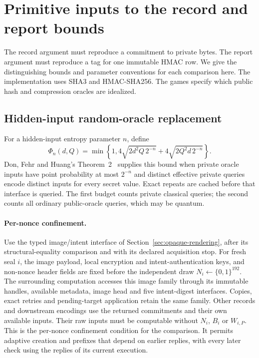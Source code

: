 \section{Primitive inputs to the record and report bounds}
\label{app:primitive-inputs}

The record argument must reproduce a commitment to private bytes.
The report argument must reproduce a tag for one immutable HMAC row.
We give the distinguishing bounds and parameter conventions for each
comparison here. The implementation uses SHA3 and HMAC-SHA256. The
games specify which public hash and compression oracles are idealized.

\subsection{Hidden-input random-oracle replacement}

For a hidden-input entropy parameter $n$, define
\[
 \Phi_n(d,Q)=\min\!\left\{1,
 4\sqrt{2d^2Q\,2^{-n}}+4\sqrt{2Q^2d\,2^{-n}}\right\}.
\]
Don, Fehr and Huang's Theorem~2~\cite{dfh2022} supplies this bound when
private oracle inputs have point probability at most $2^{-n}$ and distinct
effective private queries encode distinct inputs for every secret value.
Exact repeats are cached before that interface is queried. The first budget
counts private classical queries; the second counts all ordinary
public-oracle queries, which may be quantum.

\paragraph{Per-nonce confinement.}
Use the typed image/intent interface of
Section~\ref{sec:opaque-rendering}, after its structural-equality comparison
and with its declared acquisition stop. For fresh seal $i$, the image
payload, local encryption and intent-authentication keys, and non-nonce
header fields are fixed before the independent draw
$N_i\gets\{0,1\}^{192}$. The surrounding computation accesses this image
family through its immutable handles, available metadata, image head and
five intent-digest interfaces. Copies, exact retries and pending-target
application retain the same family. Other records and downstream encodings
use the returned commitments and their own available inputs. Their raw
inputs must be computable without $N_i$, $B_i$ or $W_{i,P}$. This is the
per-nonce confinement condition for the comparison. It permits adaptive
creation and prefixes that depend on earlier replies, with every later
check using the replies of its current execution.

